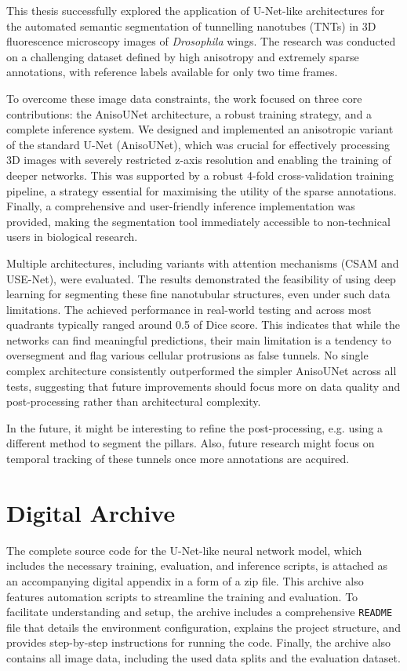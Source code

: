 \documentclass[
  digital,     %
  oneside,     %
  nosansbold,  %
  nocolorbold, %
  lof,         %
  lot,         %
]{fithesis4}
\begin{document}

This thesis successfully explored the application of U-Net-like architectures for the automated semantic segmentation of tunnelling nanotubes (TNTs) in 3D fluorescence microscopy images of \textit{Drosophila} wings. The research was conducted on a challenging dataset defined by high anisotropy and extremely sparse annotations, with reference labels available for only two time frames.

To overcome these image data constraints, the work focused on three core contributions: the AnisoUNet architecture, a robust training strategy, and a complete inference system. We designed and implemented an anisotropic variant of the standard U-Net (AnisoUNet), which was crucial for effectively processing 3D images with severely restricted z-axis resolution and enabling the training of deeper networks. This was supported by a robust 4-fold cross-validation training pipeline, a strategy essential for maximising the utility of the sparse annotations. Finally, a comprehensive and user-friendly inference implementation was provided, making the segmentation tool immediately accessible to non-technical users in biological research.

Multiple architectures, including variants with attention mechanisms (CSAM and USE-Net), were evaluated. The results demonstrated the feasibility of using deep learning for segmenting these fine nanotubular structures, even under such data limitations. The achieved performance in real-world testing and across most quadrants typically ranged around 0.5 of Dice score. This indicates that while the networks can find meaningful predictions, their main limitation is a tendency to oversegment and flag various cellular protrusions as false tunnels. No single complex architecture consistently outperformed the simpler AnisoUNet across all tests, suggesting that future improvements should focus more on data quality and post-processing rather than architectural complexity.

In the future, it might be interesting to refine the post-processing, e.g. using a different method to segment the pillars. Also, future research might focus on temporal tracking of these tunnels once more annotations are acquired.

\appendix
\chapter{Digital Archive}
The complete source code for the U-Net-like neural network model, which includes the necessary training, evaluation, and inference scripts, is attached as an accompanying digital appendix in a form of a zip file. This archive also features automation scripts to streamline the training and evaluation. To facilitate understanding and setup, the archive includes a comprehensive \texttt{README} file that details the environment configuration, explains the project structure, and provides step-by-step instructions for running the code. Finally, the archive also contains all image data, including the used data splits and the evaluation dataset.
\end{document}
